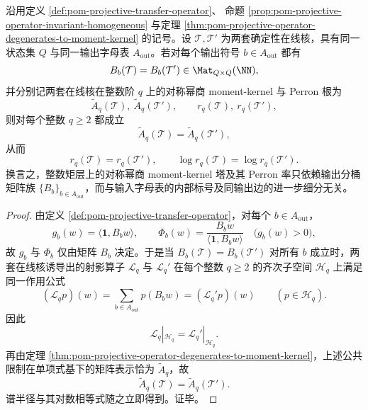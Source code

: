 \begin{theorem}[输出分桶矩阵对整数矩谱塔的完备决定性]\label{thm:xi-projective-output-bucket-determines-integer-moment-tower}
沿用定义 \ref{def:pom-projective-transfer-operator}、
命题 \ref{prop:pom-projective-operator-invariant-homogeneous}
与定理 \ref{thm:pom-projective-operator-degenerates-to-moment-kernel} 的记号。设
\(\mathcal T,\mathcal T'\)
为两套确定性在线核，具有同一状态集 \(Q\) 与同一输出字母表
\(A_{\mathrm{out}}\)。若对每个输出符号 \(b\in A_{\mathrm{out}}\) 都有
\[
B_b(\mathcal T)=B_b(\mathcal T')\in \Mat_{Q\times Q}(\NN),
\]
并分别记两套在线核在整数阶 \(q\) 上的对称幂商 moment-kernel 与 Perron 根为
\[
\widetilde A_q(\mathcal T),\ \widetilde A_q(\mathcal T'),
\qquad
r_q(\mathcal T),\ r_q(\mathcal T'),
\]
则对每个整数 \(q\ge 2\) 都成立
\[
\widetilde A_q(\mathcal T)=\widetilde A_q(\mathcal T'),
\]
从而
\[
r_q(\mathcal T)=r_q(\mathcal T'),
\qquad
\log r_q(\mathcal T)=\log r_q(\mathcal T').
\]
换言之，整数矩层上的对称幂商 moment-kernel 塔及其 Perron 率只依赖输出分桶矩阵族
\(\{B_b\}_{b\in A_{\mathrm{out}}}\)，而与输入字母表的内部标号及同输出边的进一步细分无关。
\end{theorem}
\begin{proof}
由定义 \ref{def:pom-projective-transfer-operator}，对每个 \(b\in A_{\mathrm{out}}\)，
\[
g_b(w)=\langle \mathbf 1,B_b w\rangle,
\qquad
\Phi_b(w)=\frac{B_b w}{\langle \mathbf 1,B_b w\rangle}
\quad\bigl(g_b(w)>0\bigr),
\]
故 \(g_b\) 与 \(\Phi_b\) 仅由矩阵 \(B_b\) 决定。于是当
\(B_b(\mathcal T)=B_b(\mathcal T')\)
对所有 \(b\) 成立时，两套在线核诱导出的射影算子
\(\mathcal L_q\) 与 \(\mathcal L_q'\)
在每个整数 \(q\ge 2\) 的齐次子空间 \(\mathcal H_q\) 上满足同一作用公式
\[
(\mathcal L_q p)(w)=\sum_{b\in A_{\mathrm{out}}}p(B_b w)
=
(\mathcal L_q' p)(w)
\qquad (p\in \mathcal H_q).
\]
因此
\[
\mathcal L_q|_{\mathcal H_q}=\mathcal L_q'|_{\mathcal H_q}.
\]
再由定理 \ref{thm:pom-projective-operator-degenerates-to-moment-kernel}，上述公共限制在单项式基下的矩阵表示恰为
\(\widetilde A_q\)，故
\[
\widetilde A_q(\mathcal T)=\widetilde A_q(\mathcal T').
\]
谱半径与其对数相等式随之立即得到。证毕。
\end{proof}


